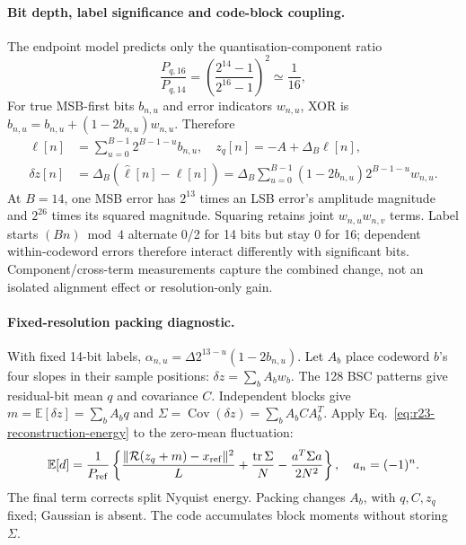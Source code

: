 \paragraph{Bit depth, label significance and code-block coupling.}
The endpoint model predicts only the quantisation-component ratio
\begin{equation}
 \frac{P_{q,16}}{P_{q,14}}
 =\left(\frac{2^{14}-1}{2^{16}-1}\right)^2\simeq\frac1{16},
 \label{eq:r51-quant-ratio}
\end{equation}
For true MSB-first bits $b_{n,u}$ and error indicators $w_{n,u}$, XOR is
$\widehat b_{n,u}=b_{n,u}+(1-2b_{n,u})w_{n,u}$. Therefore
\begin{equation}
 \begin{aligned}
 \ell[n]&=\sum_{u=0}^{B-1}2^{B-1-u}b_{n,u},\quad z_q[n]=-A+\Delta_B\ell[n],\\
 \delta z[n]&=\Delta_B(\widehat\ell[n]-\ell[n])
 =\Delta_B\sum_{u=0}^{B-1}(1-2b_{n,u})2^{B-1-u}w_{n,u}.
 \end{aligned}
 \label{eq:r51-bit-coupling}
\end{equation}
At $B=14$, one MSB error has $2^{13}$ times an LSB error's amplitude
magnitude and $2^{26}$ times its squared magnitude. Squaring retains joint
$w_{n,u}w_{n,v}$ terms. Label starts $(Bn)\bmod4$ alternate 0/2 for 14 bits
but stay 0 for 16; dependent within-codeword errors therefore interact
differently with significant bits. Component/cross-term measurements capture
the combined change, not an isolated alignment effect or resolution-only gain.

\paragraph{Fixed-resolution packing diagnostic.}
With fixed 14-bit labels, $\alpha_{n,u}=\Delta 2^{13-u}(1-2b_{n,u})$.
Let $A_b$ place codeword $b$'s four slopes in their sample positions:
$\delta z=\sum_bA_bw_b$. The 128 BSC patterns give residual-bit mean $q$
and covariance $C$. Independent blocks give
$m=\mathbb E[\delta z]=\sum_bA_bq$ and
$\Sigma=\operatorname{Cov}(\delta z)=\sum_bA_bCA_b^T$.
Apply Eq.~\eqref{eq:r23-reconstruction-energy} to the zero-mean fluctuation:
\begin{equation}
 \mathbb E[d]=\frac{1}{P_{\rm ref}}\left\{
 \frac{\|\mathcal R(z_q+m)-x_{\rm ref}\|^2}{L}
 +\frac{\operatorname{tr}\Sigma}{N}
 -\frac{a^T\Sigma a}{2N^2}\right\},\quad a_n=(-1)^n.
 \label{eq:packing-expectation}
\end{equation}
The final term corrects split Nyquist energy. Packing changes $A_b$,
with $q,C,z_q$ fixed; Gaussian is absent. The code accumulates block
moments without storing $\Sigma$.

